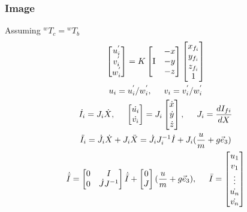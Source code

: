 \documentclass{paper}
\begin{document}
\subsubsection{Image}
Assuming ${}^{w}T_{c} = {}^{w}T_{b}$ 
\begin{gather}
\begin{bmatrix} u_{i}^{'}\\v_{i}^{'}\\w_{i}^{'} \end{bmatrix} = K\begin{bmatrix} \mbox{I}&\begin{matrix} -x\\-y\\-z \end{matrix}\end{bmatrix}\begin{bmatrix} x_{f_{i}}\\y_{f_{i}}\\z_{f_{i}}\\1 \end{bmatrix} \\
u_{i} = u_{i}^{'}/w_{i}^{'}, \hspace*{5mm} v_{i}=v_{i}^{'}/w_{i}^{'}\\
\dot{I_{i}} = J_{i} \dot{X},\hspace*{5mm}
\begin{bmatrix} \dot{u_{i}}\\\dot{v_{i}} \end{bmatrix} = J_{i}\begin{bmatrix} \dot{x}\\\dot{y}\\\dot{z}\end{bmatrix},\hspace*{5mm}
J_{i} = \frac{dI_{f{i}}}{dX} \\
\ddot{I_{i}} = \dot{J_{i}}\dot{X} + J_{i}\ddot{X} = \dot{J_{i}}J_{i}^{-1}\dot{I} + J_{i} (\frac{u}{m}+g\vec{e}_3)\\
\dot{\bar{I}} = \begin{bmatrix} 0 & I \\ 0 & \dot{J}J^{-1}\end{bmatrix}\dot{\bar{I}} + \begin{bmatrix} 0\\J\end{bmatrix}(\frac{u}{m}+g\vec{e}_3),\hspace*{5mm}
\bar{I} = \begin{bmatrix}u_{1}\\ v_{1}\\\vdots\\ \dot{u_{n}}\\\dot{v_{n}} \end{bmatrix}
\end{gather}
\end{document}
